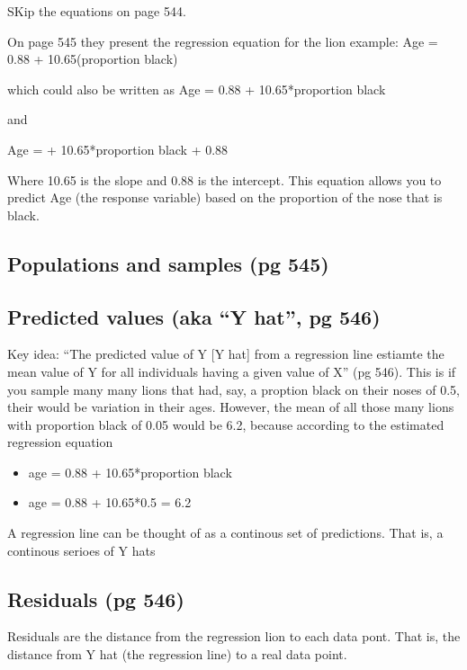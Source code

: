 \documentclass[]{book}
\providecommand{\tightlist}{%
  \setlength{\itemsep}{0pt}\setlength{\parskip}{0pt}}
\theoremstyle{definition}
\theoremstyle{definition}
\theoremstyle{definition}
\theoremstyle{remark}
\begin{document}
SKip the equations on page 544.

On page 545 they present the regression equation for the lion example:
Age = 0.88 + 10.65(proportion black)

which could also be written as Age = 0.88 + 10.65*proportion black

and

Age = + 10.65*proportion black + 0.88

Where 10.65 is the slope and 0.88 is the intercept. This equation allows
you to predict Age (the response variable) based on the proportion of
the nose that is black.

\subsection{Populations and samples (pg
545)}\label{populations-and-samples-pg-545}

\subsection{\texorpdfstring{Predicted values (aka ``Y hat'', pg
546)}{Predicted values (aka Y hat, pg 546)}}\label{predicted-values-aka-y-hat-pg-546}

Key idea: ``The predicted value of Y {[}Y hat{]} from a regression line
estiamte the mean value of Y for all individuals having a given value of
X'' (pg 546). This is if you sample many many lions that had, say, a
proption black on their noses of 0.5, their would be variation in their
ages. However, the mean of all those many lions with proportion black of
0.05 would be 6.2, because according to the estimated regression
equation

\begin{itemize}
\tightlist
\item
  age = 0.88 + 10.65*proportion black
\item
  age = 0.88 + 10.65*0.5 = 6.2
\end{itemize}

A regression line can be thought of as a continous set of predictions.
That is, a continous serioes of Y hats

\subsection{Residuals (pg 546)}\label{residuals-pg-546}

Residuals are the distance from the regression lion to each data pont.
That is, the distance from Y hat (the regression line) to a real data
point.
\end{document}
